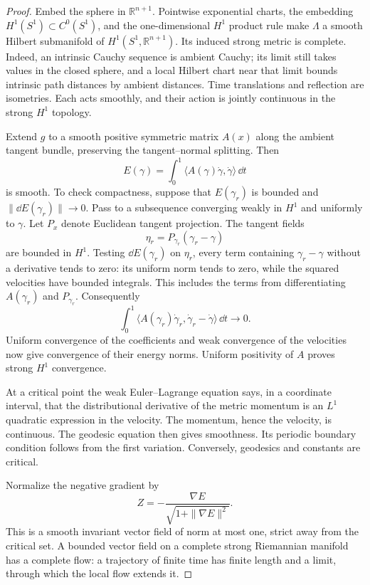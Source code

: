 \begin{proof}
Embed the sphere in \(\mathbb R^{n+1}\).  Pointwise exponential charts,
the embedding \(H^1(S^1)\subset C^0(S^1)\), and the one-dimensional
\(H^1\) product rule make \(\Lambda\) a smooth Hilbert submanifold of
\(H^1(S^1,\mathbb R^{n+1})\).  Its induced strong metric is complete.
Indeed, an intrinsic Cauchy sequence is ambient Cauchy; its limit still
takes values in the closed sphere, and a local Hilbert chart near that
limit bounds intrinsic path distances by ambient distances.  Time
translations and reflection are isometries.  Each acts smoothly, and
their action is jointly continuous in the strong \(H^1\) topology.

Extend \(g\) to a smooth positive symmetric matrix \(A(x)\) along the
ambient tangent bundle, preserving the tangent--normal splitting.
Then
\[
 E(\gamma)=\int_0^1
       \langle A(\gamma)\dot\gamma,\dot\gamma\rangle\,\dd t
\]
is smooth.  To check compactness, suppose that \(E(\gamma_r)\) is bounded
and \(\| \dd E(\gamma_r)\|\to0\).  Pass to a subsequence converging weakly
in \(H^1\) and uniformly to \(\gamma\).  Let \(P_x\) denote Euclidean
tangent projection.  The tangent fields
\[
 \eta_r=P_{\gamma_r}(\gamma_r-\gamma)
\]
are bounded in \(H^1\).  Testing \(\dd E(\gamma_r)\) on \(\eta_r\), every
term containing \(\gamma_r-\gamma\) without a derivative tends to zero:
its uniform norm tends to zero, while the squared velocities have
bounded integrals.  This includes the terms from differentiating
\(A(\gamma_r)\) and \(P_{\gamma_r}\).  Consequently
\[
 \int_0^1\!
 \langle A(\gamma_r)\dot\gamma_r,
                 \dot\gamma_r-\dot\gamma\rangle\,\dd t\longrightarrow0.
\]
Uniform convergence of the coefficients and weak convergence of the
velocities now give convergence of their energy norms.  Uniform
positivity of \(A\) proves strong \(H^1\) convergence.

At a critical point the weak Euler--Lagrange equation says, in a
coordinate interval, that the distributional derivative of the metric
momentum is an \(L^1\) quadratic expression in the velocity.  The
momentum, hence the velocity, is continuous.  The geodesic equation
then gives smoothness.  Its periodic boundary condition follows from
the first variation.  Conversely, geodesics and constants are critical.

Normalize the negative gradient by
\[
 Z=-\frac{\nabla E}{\sqrt{1+\|\nabla E\|^2}}.
\]
This is a smooth invariant vector field of norm at most one, strict
away from the critical set.  A bounded vector field on a complete
strong Riemannian manifold has a complete flow: a trajectory of finite
time has finite length and a limit, through which the local flow
extends it.


\end{proof}
